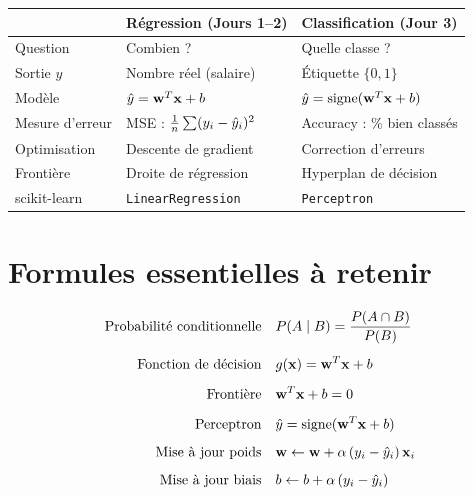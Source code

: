 \begin{center}
\renewcommand{\arraystretch}{1.4}
\begin{tabularx}{\textwidth}{l >{\centering\arraybackslash}X >{\centering\arraybackslash}X}
    \toprule
    & \textbf{R\'{e}gression (Jours 1--2)} & \textbf{Classification (Jour 3)} \\
    \midrule
    Question
        & Combien ?
        & Quelle classe ? \\
    Sortie $y$
        & Nombre r\'{e}el (salaire)
        & \'{E}tiquette $\{0, 1\}$ \\
    Mod\`{e}le
        & $\hat{y} = \mathbf{w}^T\mathbf{x} + b$
        & $\hat{y} = \text{signe}(\mathbf{w}^T\mathbf{x} + b)$ \\
    Mesure d'erreur
        & MSE : $\frac{1}{n}\sum(y_i - \hat{y}_i)^2$
        & Accuracy : \% bien class\'{e}s \\
    Optimisation
        & Descente de gradient
        & Correction d'erreurs \\
    Fronti\`{e}re
        & Droite de r\'{e}gression
        & Hyperplan de d\'{e}cision \\
    scikit-learn
        & \texttt{LinearRegression}
        & \texttt{Perceptron} \\
    \bottomrule
\end{tabularx}
\end{center}

\section{Formules essentielles \`{a} retenir}

\begin{tcolorbox}[
    enhanced, colback=ipssiBleu!3, colframe=ipssiBleu!40, boxrule=1pt, arc=4pt,
    title={\sffamily\bfseries Formules du Jour 3}, coltitle=white, colbacktitle=ipssiBleu!70,
]
\begin{align}
    \text{Probabilit\'{e} conditionnelle}\quad
        & P(A \mid B) = \frac{P(A \cap B)}{P(B)}
        \label{eq:f-cond} \\[5pt]
    \text{Fonction de d\'{e}cision}\quad
        & g(\mathbf{x}) = \mathbf{w}^T \mathbf{x} + b
        \label{eq:f-decision} \\[5pt]
    \text{Fronti\`{e}re}\quad
        & \mathbf{w}^T \mathbf{x} + b = 0
        \label{eq:f-front} \\[5pt]
    \text{Perceptron}\quad
        & \hat{y} = \text{signe}(\mathbf{w}^T \mathbf{x} + b)
        \label{eq:f-perceptron} \\[5pt]
    \text{Mise \`{a} jour poids}\quad
        & \mathbf{w} \leftarrow \mathbf{w} + \alpha\,(y_i - \hat{y}_i)\,\mathbf{x}_i
        \label{eq:f-update-w} \\[5pt]
    \text{Mise \`{a} jour biais}\quad
        & b \leftarrow b + \alpha\,(y_i - \hat{y}_i)
        \label{eq:f-update-b}
\end{align}
\end{tcolorbox}

